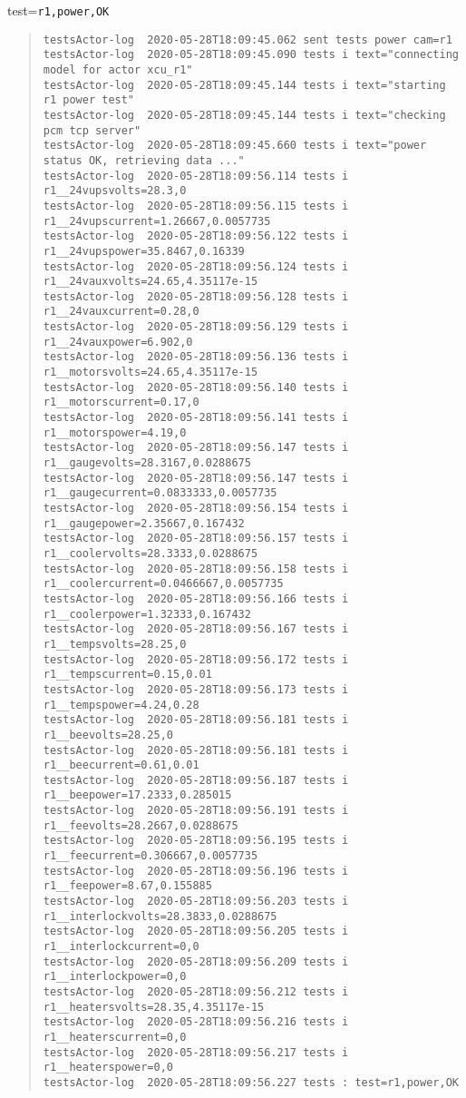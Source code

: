 \noindent test=\texttt{r1,power,OK}

\begin{quote}
\begin{tiny}
\begin{verbatim}
testsActor-log  2020-05-28T18:09:45.062 sent tests power cam=r1
testsActor-log  2020-05-28T18:09:45.090 tests i text="connecting model for actor xcu_r1"
testsActor-log  2020-05-28T18:09:45.144 tests i text="starting r1 power test"
testsActor-log  2020-05-28T18:09:45.144 tests i text="checking pcm tcp server"
testsActor-log  2020-05-28T18:09:45.660 tests i text="power status OK, retrieving data ..."
testsActor-log  2020-05-28T18:09:56.114 tests i r1__24vupsvolts=28.3,0
testsActor-log  2020-05-28T18:09:56.115 tests i r1__24vupscurrent=1.26667,0.0057735
testsActor-log  2020-05-28T18:09:56.122 tests i r1__24vupspower=35.8467,0.16339
testsActor-log  2020-05-28T18:09:56.124 tests i r1__24vauxvolts=24.65,4.35117e-15
testsActor-log  2020-05-28T18:09:56.128 tests i r1__24vauxcurrent=0.28,0
testsActor-log  2020-05-28T18:09:56.129 tests i r1__24vauxpower=6.902,0
testsActor-log  2020-05-28T18:09:56.136 tests i r1__motorsvolts=24.65,4.35117e-15
testsActor-log  2020-05-28T18:09:56.140 tests i r1__motorscurrent=0.17,0
testsActor-log  2020-05-28T18:09:56.141 tests i r1__motorspower=4.19,0
testsActor-log  2020-05-28T18:09:56.147 tests i r1__gaugevolts=28.3167,0.0288675
testsActor-log  2020-05-28T18:09:56.147 tests i r1__gaugecurrent=0.0833333,0.0057735
testsActor-log  2020-05-28T18:09:56.154 tests i r1__gaugepower=2.35667,0.167432
testsActor-log  2020-05-28T18:09:56.157 tests i r1__coolervolts=28.3333,0.0288675
testsActor-log  2020-05-28T18:09:56.158 tests i r1__coolercurrent=0.0466667,0.0057735
testsActor-log  2020-05-28T18:09:56.166 tests i r1__coolerpower=1.32333,0.167432
testsActor-log  2020-05-28T18:09:56.167 tests i r1__tempsvolts=28.25,0
testsActor-log  2020-05-28T18:09:56.172 tests i r1__tempscurrent=0.15,0.01
testsActor-log  2020-05-28T18:09:56.173 tests i r1__tempspower=4.24,0.28
testsActor-log  2020-05-28T18:09:56.181 tests i r1__beevolts=28.25,0
testsActor-log  2020-05-28T18:09:56.181 tests i r1__beecurrent=0.61,0.01
testsActor-log  2020-05-28T18:09:56.187 tests i r1__beepower=17.2333,0.285015
testsActor-log  2020-05-28T18:09:56.191 tests i r1__feevolts=28.2667,0.0288675
testsActor-log  2020-05-28T18:09:56.195 tests i r1__feecurrent=0.306667,0.0057735
testsActor-log  2020-05-28T18:09:56.196 tests i r1__feepower=8.67,0.155885
testsActor-log  2020-05-28T18:09:56.203 tests i r1__interlockvolts=28.3833,0.0288675
testsActor-log  2020-05-28T18:09:56.205 tests i r1__interlockcurrent=0,0
testsActor-log  2020-05-28T18:09:56.209 tests i r1__interlockpower=0,0
testsActor-log  2020-05-28T18:09:56.212 tests i r1__heatersvolts=28.35,4.35117e-15
testsActor-log  2020-05-28T18:09:56.216 tests i r1__heaterscurrent=0,0
testsActor-log  2020-05-28T18:09:56.217 tests i r1__heaterspower=0,0
testsActor-log  2020-05-28T18:09:56.227 tests : test=r1,power,OK
\end{verbatim}
\end{tiny}
\end{quote}

